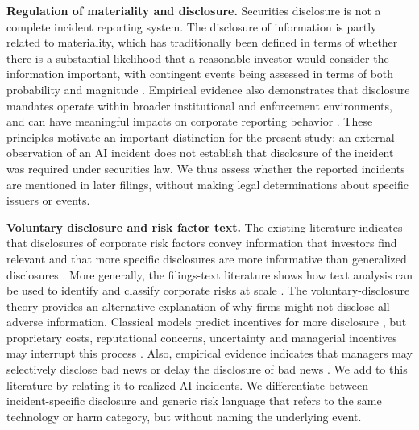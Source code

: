 \documentclass[utf8]{FrontiersinHarvard}
\begin{document}
\textbf{Regulation of materiality and disclosure.} Securities disclosure is not a complete incident reporting system. The disclosure of information is partly related to materiality, which has traditionally been defined in terms of whether there is a substantial likelihood that a reasonable investor would consider the information important, with contingent events being assessed in terms of both probability and magnitude \citep{TSC1976,Basic1988}. Empirical evidence also demonstrates that disclosure mandates operate within broader institutional and enforcement environments, and can have meaningful impacts on corporate reporting behavior \citep{ChristensenHailLeuz2016,LeuzWysocki2016}. These principles motivate an important distinction for the present study: an external observation of an AI incident does not establish that disclosure of the incident was required under securities law. We thus assess whether the reported incidents are mentioned in later filings, without making legal determinations about specific issuers or events.

\textbf{Voluntary disclosure and risk factor text.} The existing literature indicates that disclosures of corporate risk factors convey information that investors find relevant \citep{Campbell2014,KravetMuslu2013} and that more specific disclosures are more informative than generalized disclosures \citep{Hope2016}. More generally, the filings-text literature shows how text analysis can be used to identify and classify corporate risks at scale \citep{LoughranMcDonald2011,BaoDatta2014}. The voluntary-disclosure theory provides an alternative explanation of why firms might not disclose all adverse information. Classical models predict incentives for more disclosure \citep{Grossman1981,Milgrom1981}, but proprietary costs, reputational concerns, uncertainty and managerial incentives may interrupt this process \citep{Dye1985,Verrecchia2001,HealyPalepu2001}. Also, empirical evidence indicates that managers may selectively disclose bad news or delay the disclosure of bad news \citep{Skinner1994,KothariShuWysocki2009,Beyer2010}. We add to this literature by relating it to realized AI incidents. We differentiate between incident-specific disclosure and generic risk language that refers to the same technology or harm category, but without naming the underlying event.
\end{document}
